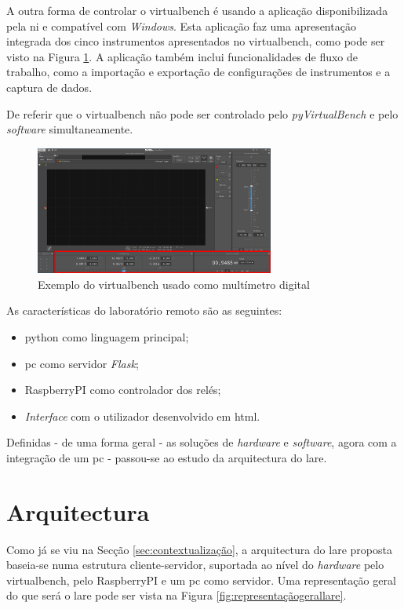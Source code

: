 A outra forma de controlar o \acrshort{virtualbench} é usando a aplicação disponibilizada pela \acrshort{ni}  e compatível com \textit{Windows}. Esta aplicação faz uma apresentação integrada dos cinco instrumentos apresentados no \acrshort{virtualbench}, como pode ser visto na Figura \ref{fig:leituraohm}. A aplicação também inclui funcionalidades de fluxo de trabalho, como a importação e exportação de configurações de instrumentos e a captura de dados.

De referir que o \acrshort{virtualbench} não pode ser controlado pelo \textit{pyVirtualBench} e pelo \textit{software} simultaneamente.

\begin{figure}[hbtp]
    \centering
    \includegraphics[width=0.7\textwidth]{figures/VB8012-OHM_Exemplo.png}
    \caption{Exemplo do \acrshort{virtualbench} usado como multímetro digital}
    \label{fig:leituraohm}
\end{figure}

As características do \acrshort{laboratório remoto} são as seguintes:
\begin{itemize}
    \item \gls{python} como linguagem principal;
    \item \acrshort{pc} como servidor \textit{Flask};
    \item \gls{RaspberryPI} como controlador dos relés;
    \item \textit{Interface} com o utilizador desenvolvido em \acrshort{html}.
\end{itemize}

Definidas - de uma forma geral - as soluções de \textit{hardware} e \textit{software}, agora com a integração de um \acrshort{pc} - passou-se ao estudo da arquitectura do \acrshort{lare}.

\section{Arquitectura}
\label{sec:arquitectura}
Como já se viu na Secção \ref{sec:contextualização}, a arquitectura do \acrshort{lare} proposta baseia-se numa estrutura cliente-servidor, suportada ao nível do \textit{hardware} pelo \acrshort{virtualbench}, pelo \gls{RaspberryPI} e um \acrshort{pc} como servidor. Uma representação geral do que será o \acrshort{lare} pode ser vista na Figura \ref{fig:representaçãogerallare}.

